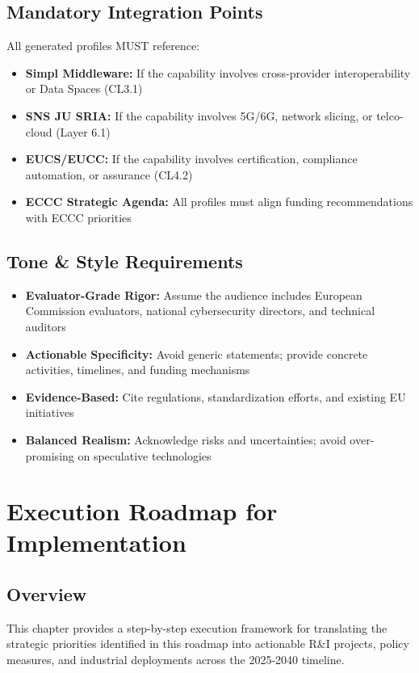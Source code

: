 \documentclass[12pt,a4paper]{article}
\begin{document}
\subsection*{Mandatory Integration Points}
All generated profiles MUST reference:
\begin{itemize}
    \item \textbf{Simpl Middleware:} If the capability involves cross-provider interoperability or Data Spaces (CL3.1)
    \item \textbf{SNS JU SRIA:} If the capability involves 5G/6G, network slicing, or telco-cloud (Layer 6.1)
    \item \textbf{EUCS/EUCC:} If the capability involves certification, compliance automation, or assurance (CL4.2)
    \item \textbf{ECCC Strategic Agenda:} All profiles must align funding recommendations with ECCC priorities
\end{itemize}

\subsection*{Tone \& Style Requirements}
\begin{itemize}
    \item \textbf{Evaluator-Grade Rigor:} Assume the audience includes European Commission evaluators, national cybersecurity directors, and technical auditors
    \item \textbf{Actionable Specificity:} Avoid generic statements; provide concrete activities, timelines, and funding mechanisms
    \item \textbf{Evidence-Based:} Cite regulations, standardization efforts, and existing EU initiatives
    \item \textbf{Balanced Realism:} Acknowledge risks and uncertainties; avoid over-promising on speculative technologies
\end{itemize}

\newpage
\section{Execution Roadmap for Implementation}

\subsection*{Overview}
This chapter provides a step-by-step execution framework for translating the strategic priorities identified in this roadmap into actionable R\&I projects, policy measures, and industrial deployments across the 2025-2040 timeline.
\end{document}
